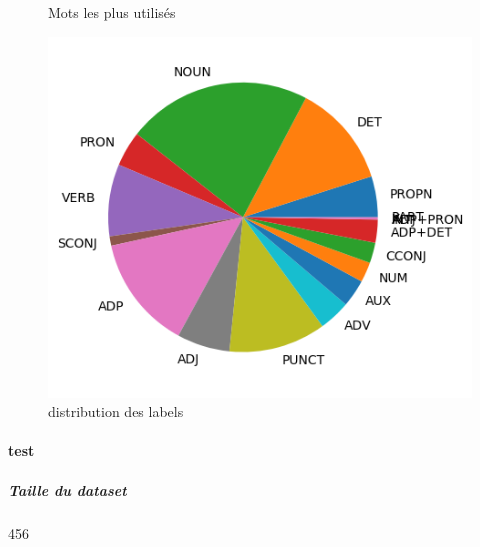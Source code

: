 \begin{figure}[H]
\begin{minipage}{0.48\textwidth}
\begin{tabular}{|l || *{11 }{|c} |}
\end{tabular}
\caption{ Mots les plus utilisés } \label{Fig:muw}\end{minipage} 
\begin{minipage}{0.48\textwidth} \centering
\label{Fig:sequoiatrain_img.png}
\caption{distribution des labels}\includegraphics[width=.7\linewidth]{sequoiatrain_img.png}

\end{minipage}
\end{figure}\paragraph{test}
\subparagraph{Taille du dataset}456
